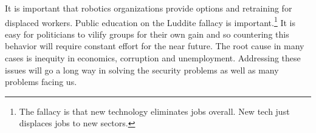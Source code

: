 It is important that robotics organizations provide options and
retraining for displaced workers. Public education on the Luddite
fallacy is important.\footnote{The fallacy is that new technology
  eliminates jobs overall. New tech just displaces jobs to new sectors.}
It is easy for politicians to vilify groups for their own gain and so
countering this behavior will require constant effort for the near
future. The root cause in many cases is inequity in economics,
corruption and unemployment. Addressing these issues will go a long way
in solving the security problems as well as many problems facing us.
